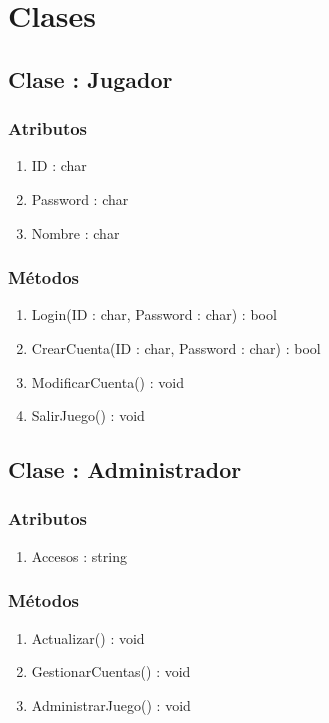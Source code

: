 \section{Clases}\label{sec:uc0}
\subsection{Clase : Jugador}\label{sec:uc0}
\subsubsection{Atributos}
\begin{enumerate}
\item ID : char
\item Password : char
\item Nombre : char
\end{enumerate}

\subsubsection{Métodos}
\begin{enumerate}
\item Login(ID : char, Password : char) : bool
\item CrearCuenta(ID : char, Password : char) : bool
\item ModificarCuenta() : void
\item SalirJuego() : void
\end{enumerate}



\subsection{Clase : Administrador}\label{sec:uc0}
\subsubsection{Atributos}
\begin{enumerate}
\item Accesos : string
\end{enumerate}

\subsubsection{Métodos}
\begin{enumerate}
\item Actualizar() : void
\item GestionarCuentas() : void
\item AdministrarJuego() : void
\end{enumerate}



